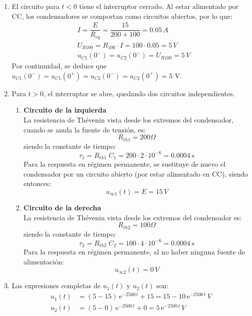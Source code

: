\begin{enumerate}
    \item El circuito para $t<0$ tiene el interruptor cerrado. Al estar alimentado por CC, los condensadores se comportan como circuitos abiertos, por lo que:
    \begin{align*}
        &I=\dfrac{E}{R_{eq}}=\dfrac{15}{200+100}=0.05\,A\\
        &U_{R100}=R_{100}\cdot I=100\cdot 0.05=5\,V\\
        &u_{C1}(0^-)=u_{C2}(0^-)=U_{R100}=5\,V
    \end{align*}
    Por continuidad, se deduce que $u_{C1}(0^-)=u_{C1}(0^+)=u_{C2}(0^-)=u_{C2}(0^+)=5$ V.
    \item Para $t>0$, el interruptor se abre, quedando dos circuitos independientes. 
    \begin{enumerate}
        \item \textbf{Circuito de la izquierda}\\
        La resistencia de Thévenin vista desde los extremos del condensador, cuando se anula la fuente de tensión, es:
    \begin{equation*}
        R_{th1}=200\Omega
    \end{equation*}
    siendo la constante de tiempo:
    \begin{equation*}
        \tau_1=R_{th1}\;C_1=200\cdot 2\cdot10^{-6}=0.0004\,s
    \end{equation*}
    Para la respuesta en régimen permanente, se sustituye de nuevo el condensador por un circuito abierto (por estar alimentado en CC), siendo entonces:
    \begin{equation*}
        u_{\infty1}(t)=E=15\,V
    \end{equation*}
    \item \textbf{Circuito de la derecha}\\
        La resistencia de Thévenin vista desde los extremos del condensador es:
    \begin{equation*}
        R_{th2}=100\Omega
    \end{equation*}
    siendo la constante de tiempo:
    \begin{equation*}
        \tau_2=R_{th2}\;C_2=100\cdot 4\cdot10^{-6}=0.0004\,s
    \end{equation*}
    Para la respuesta en régimen permanente, al no haber ninguna fuente de alimentación:
    \begin{equation*}
        u_{\infty2}(t)=0\,V
    \end{equation*}
    \end{enumerate}
    \item Las expresiones completas de $u_1(t)$ y $u_2(t)$ son:
    \begin{align*}
        u_1(t)&=\left(5-15 \right)\,\mathrm{e}^{-2500\,t}+15=15-10\,\mathrm{e}^{-2500\,t}\,V\\
        u_2(t)&=\left(5-0 \right)\,\mathrm{e}^{-2500\,t}+0=5\,\mathrm{e}^{-2500\,t}\,V
    \end{align*}
\end{enumerate}



